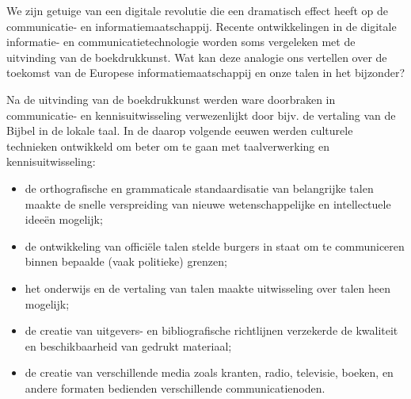 \documentclass[]{../../metanetpaper}
\begin{document}
\clearpage



\begin{multicols}{2}

We zijn getuige van een digitale revolutie die een dramatisch effect heeft op de communicatie- en informatiemaatschappij. Recente ontwikkelingen in de digitale informatie- en communicatietechnologie worden soms vergeleken met de uitvinding van de boekdrukkunst. Wat kan deze analogie ons vertellen over de toekomst van de Europese informatiemaatschappij en onze talen in het bijzonder?


 Na de uitvinding van de boekdrukkunst werden ware doorbraken in communicatie- en kennisuitwisseling verwezenlijkt door bijv. de vertaling van de Bijbel in de lokale taal. In de daarop volgende eeuwen werden culturele technieken ontwikkeld om beter om te gaan met taalverwerking en kennisuitwisseling:
    \begin{itemize}
      \item de orthografische en grammaticale standaardisatie van belangrijke talen maakte de snelle verspreiding van nieuwe wetenschappelijke en intellectuele idee{\"e}n mogelijk;
      \item de ontwikkeling van offici{\"e}le talen stelde burgers in staat om te communiceren binnen bepaalde (vaak politieke) grenzen;
 	  \item het onderwijs en de vertaling van talen maakte uitwisseling over talen heen mogelijk;
 	  \item de creatie van uitgevers- en bibliografische richtlijnen verzekerde de kwaliteit en beschikbaarheid van gedrukt materiaal;
 	  \item de creatie van verschillende media zoals kranten, radio, televisie, boeken, en andere formaten bedienden verschillende communicatienoden.
     \end{itemize}


\end{multicols}
\end{document}
